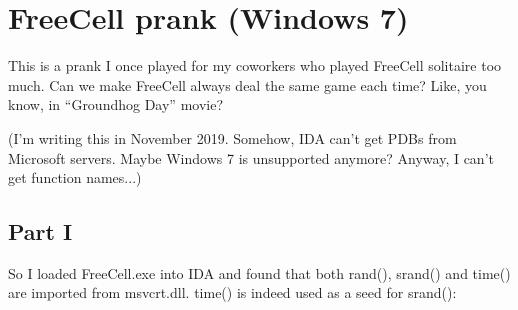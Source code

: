 ﻿\section{FreeCell prank (Windows 7)}

\renewcommand{\CURPATH}{examples/freecell}

This is a prank I once played for my coworkers who played FreeCell solitaire too much.
Can we make FreeCell always deal the same game each time?
Like, you know, in ``Groundhog Day'' movie?

(I'm writing this in November 2019. Somehow, IDA can't get PDBs from Microsoft servers. Maybe Windows 7 is unsupported anymore?
Anyway, I can't get function names...)

\subsection{Part I}

So I loaded FreeCell.exe into IDA and found that both rand(), srand() and time() are imported from msvcrt.dll.
time() is indeed used as a seed for srand():

